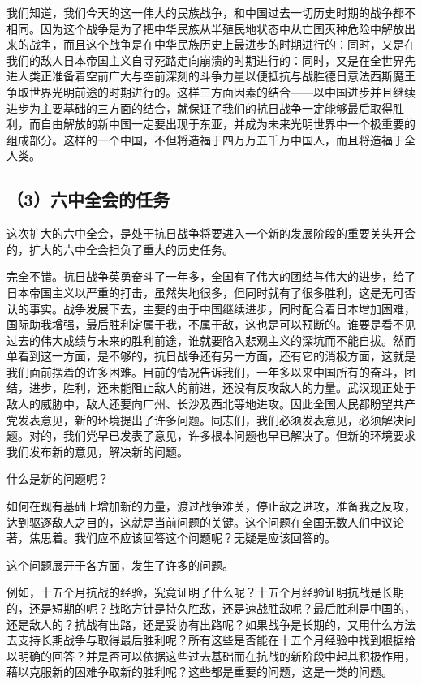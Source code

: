 我们知道，我们今天的这一伟大的民族战争，和中国过去一切历史时期的战争都不相同。因为这个战争是为了把中华民族从半殖民地状态中从亡国灭种危险中解放出来的战争，而且这个战争是在中华民族历史上最进步的时期进行的：同时，又是在我们的敌人日本帝国主义自寻死路走向崩溃的时期进行的：同时，又是在全世界先进人类正准备着空前广大与空前深刻的斗争力量以便抵抗与战胜德日意法西斯魔王争取世界光明前途的时期进行的。这样三方面因素的结合——以中国进步并且继续进步为主要基础的三方面的结合，就保证了我们的抗日战争一定能够最后取得胜利，而自由解放的新中国一定要出现于东亚，并成为未来光明世界中一个极重要的组成部分。这样的一个中国，不但将造福于四万万五千万中国人，而且将造福于全人类。

\subsection{（3）六中全会的任务}

这次扩大的六中全会，是处于抗日战争将要进入一个新的发展阶段的重要关头开会的，扩大的六中全会担负了重大的历史任务。

完全不错。抗日战争英勇奋斗了一年多，全国有了伟大的团结与伟大的进步，给了日本帝国主义以严重的打击，虽然失地很多，但同时就有了很多胜利，这是无可否认的事实。战争发展下去，主要的由于中国继续进步，同时配合着日本增加困难，国际助我增强，最后胜利定属于我，不属于敌，这也是可以预断的。谁要是看不见过去的伟大成绩与未来的胜利前途，谁就要陷入悲观主义的深坑而不能自拔。然而单看到这一方面，是不够的，抗日战争还有另一方面，还有它的消极方面，这就是我们面前摆着的许多困难。目前的情况告诉我们，一年多以来中国所有的奋斗，团结，进步，胜利，还未能阻止敌人的前进，还没有反攻敌人的力量。武汉现正处于敌人的威胁中，敌人还要向广州、长沙及西北等地进攻。因此全国人民都盼望共产党发表意见，新的环境提出了许多问题。同志们，我们必须发表意见，必须解决问题。对的，我们党早已发表了意见，许多根本问题也早已解决了。但新的环境要求我们发布新的意见，解决新的问题。

什么是新的问题呢？

如何在现有基础上增加新的力量，渡过战争难关，停止敌之进攻，准备我之反攻，达到驱逐敌人之目的，这就是当前问题的关键。这个问题在全国无数人们中议论著，焦思着。我们应不应该回答这个问题呢？无疑是应该回答的。

这个问题展开于各方面，发生了许多的问题。

例如，十五个月抗战的经验，究竟证明了什么呢？十五个月经验证明抗战是长期的，还是短期的呢？战略方针是持久胜敌，还是速战胜敌呢？最后胜利是中国的，还是敌人的？抗战有出路，还是妥协有出路呢？如果战争是长期的，又用什么方法去支持长期战争与取得最后胜利呢？所有这些是否能在十五个月经验中找到根据给以明确的回答？并是否可以依据这些过去基础而在抗战的新阶段中起其积极作用，藉以克服新的困难争取新的胜利呢？这些都是重要的问题，这是一类的问题。

